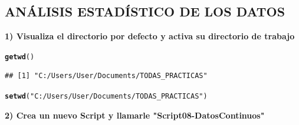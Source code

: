 \documentclass[12pt,letterpaper]{article}\usepackage[]{graphicx}\usepackage[]{color}
\makeatletter
\newcommand{\hlstr}[1]{\textcolor[rgb]{0.192,0.494,0.8}{#1}}%
\newcommand{\hlstd}[1]{\textcolor[rgb]{0.345,0.345,0.345}{#1}}%
\newcommand{\hlkwd}[1]{\textcolor[rgb]{0.737,0.353,0.396}{\textbf{#1}}}%
\newenvironment{kframe}{%
 \def\at@end@of@kframe{}%
 \ifinner\ifhmode%
  \def\at@end@of@kframe{\end{minipage}}%
  \begin{minipage}{\columnwidth}%
 \fi\fi%
 \def\FrameCommand##1{\hskip\@totalleftmargin \hskip-\fboxsep
 \colorbox{shadecolor}{##1}\hskip-\fboxsep
     \hskip-\linewidth \hskip-\@totalleftmargin \hskip\columnwidth}%
 \MakeFramed {\advance\hsize-\width
   \@totalleftmargin\z@ \linewidth\hsize
   \@setminipage}}%
 {\par\unskip\endMakeFramed%
 \at@end@of@kframe}
\newenvironment{knitrout}{}{} %
\makeatother
\begin{document}
\subsection{AN\'ALISIS ESTAD\'ISTICO DE LOS DATOS}

\textbf{1) Visualiza el directorio por defecto y activa su directorio de trabajo}
\begin{knitrout}
\color{fgcolor}\begin{kframe}
\begin{alltt}
\hlkwd{getwd}\hlstd{()}
\end{alltt}
\begin{verbatim}
## [1] "C:/Users/User/Documents/TODAS_PRACTICAS"
\end{verbatim}
\begin{alltt}
\hlkwd{setwd}\hlstd{(}\hlstr{"C:/Users/User/Documents/TODAS_PRACTICAS"}\hlstd{)}
\end{alltt}
\end{kframe}
\end{knitrout}
\textbf{2) Crea un nuevo Script y llamarle "Script08-DatosContinuos"}
\end{document}
